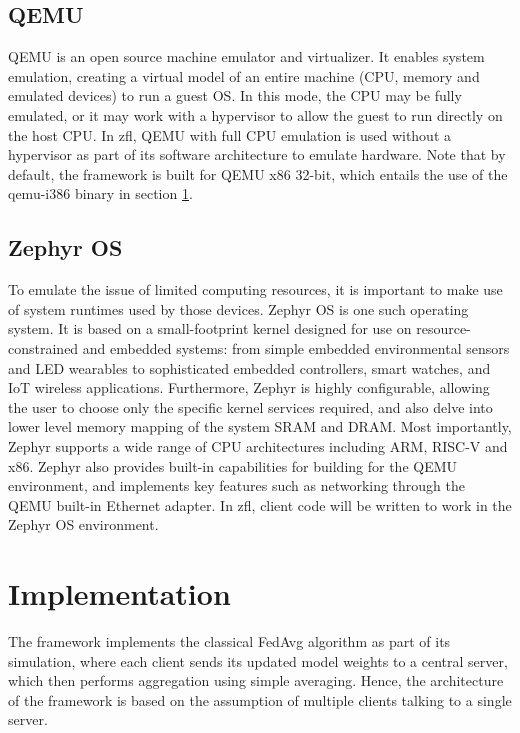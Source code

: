 \documentclass[12pt]{article}
\begin{document}
\subsection{QEMU}
QEMU\cite{qemu} is an open source machine emulator and virtualizer. It enables system emulation,
creating a virtual model of an entire machine (CPU, memory and emulated devices) to run a guest OS.
In this mode, the CPU may be fully emulated, or it may work with a hypervisor to allow the guest to
run directly on the host CPU. In zfl, QEMU with full CPU emulation is used without a hypervisor as
part of its software architecture to emulate hardware. Note that by default, the framework
is built for QEMU x86 32-bit, which entails the use of the qemu-i386 binary in section \ref{implementation}.

\subsection{Zephyr OS}
To emulate the issue of limited computing resources, it is important to make use of system runtimes
used by those devices. Zephyr OS\cite{zephyr} is one such operating system. It is based on a small-footprint kernel designed for use on resource-constrained
and embedded systems: from simple embedded environmental sensors and LED wearables to sophisticated embedded controllers, smart watches, and IoT wireless applications.
Furthermore, Zephyr is highly configurable, allowing the user to choose only the specific kernel
services required, and also delve into lower level memory mapping of the system SRAM and DRAM. Most
importantly, Zephyr supports a wide range of CPU architectures including ARM, RISC-V and x86.
Zephyr also provides built-in capabilities for building for the QEMU environment, and implements key
features such as networking through the QEMU built-in Ethernet adapter. In zfl,
client code will be written to work in the Zephyr OS environment.

\section{Implementation}\label{implementation}
The framework implements the classical FedAvg algorithm\cite{brendan_2016_communicationefficient} as part of
its simulation, where each client sends its updated model weights to a central server, which then performs aggregation
using simple averaging. Hence, the architecture of the framework is based on the assumption of
multiple clients talking to a single server.\\
\end{document}
